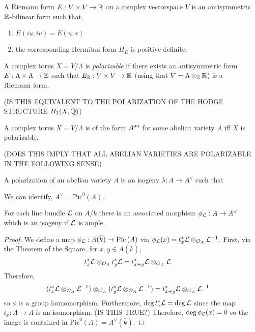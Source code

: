 \documentclass[12pt]{article}
\begin{document}
\begin{definition}
A Riemann form $E : V \times V \to \mathbb{R}$ on a complex vectorspace $V$ is an antisymmetric $\mathbb{R}$-bilinear form such that,
\begin{enumerate}
\item $E(i u, i v) = E(u, v)$ 
\item the corresponding Hermitan form $H_E$ is positive definite.
\end{enumerate}
\end{definition}

\begin{definition}
A complex torus $X = V / \Lambda$ is \textit{polarizable} if there exists an antisymmetric form $E : \Lambda \times \Lambda \to \mathbb{Z}$ such that $E_{\mathbb{R}} : V \times V \to \mathbb{R}$ (using that $V = \Lambda \otimes_{\mathbb{Z}} \mathbb{R}$) is a Riemann form.  
\end{definition}

(IS THIS EQUIVALENT TO THE POLARIZATION OF THE HODGE STRUCTURE $H_1(X, \mathbb{Q})$)

\begin{theorem}
A complex torus $X = V / \Lambda$ is of the form $A^{\mathrm{an}}$ for some abelian variety $A$ iff $X$ is polarizable.
\end{theorem}

(DOES THIS IMPLY THAT ALL ABELIAN VARIETIES ARE POLARIZABLE IN THE FOLLOWING SENSE)

\begin{definition}
A polarization of an abelian variety $A$ is an isogeny $\lambda : A \to A^\vee$ such that 
\end{definition}

\begin{remark}
We can identify, $A^\vee = \mathrm{Pic}^0\left( A \right)$.
\end{remark}

\begin{proposition}
For each line bundle $\mathcal{L}$ on $A / k$ there is an associated morphism $\phi_{\mathcal{L}} : A \to A^\vee$ which is an isogeny if $\mathcal{L}$ is ample.
\end{proposition}

\begin{proof}
We define a map $\phi_{\mathcal{L}} : A(\overline{k}) \to \mathrm{Pic} \left( A \right)$ via $\phi_{\mathcal{L}}(x) = t^*_x \mathcal{L} \otimes_{\mathcal{O}_{A}} \mathcal{L}^{-1}$. First, via the Theorem of the Square, for $x,y \in A(\overline{k})$,
\[ t_x^* \mathcal{L} \otimes_{\mathcal{O}_{A}} t_y^* \mathcal{L} = t^*_{x + y} \mathcal{L} \otimes_{\mathcal{O}_{A}} \mathcal{L} \]
Therefore,
\[ (t_x^* \mathcal{L} \otimes_{\mathcal{O}_{A}} \mathcal{L}^{-1}) \otimes_{\mathcal{O}_{A}} (t_y^* \mathcal{L} \otimes_{\mathcal{O}_{A}} \mathcal{L}^{-1}) = t^*_{x + y} \mathcal{L} \otimes_{\mathcal{O}_{A}} \mathcal{L}^{-1} \]
so $\phi$ is a group homomorphism. Furthermore, $\deg{t_x^* \mathcal{L}} = \deg{\mathcal{L}}$ since the map $t_x : A \to A$ is an isomorphism. (IS THIS TRUE?) Therefore, $\deg{\phi_{\mathcal{L}}(x)} = 0$ so the image is contained in $\mathrm{Pic}^0(A) = A^\vee(\overline{k})$. 
\end{proof}
\end{document}
